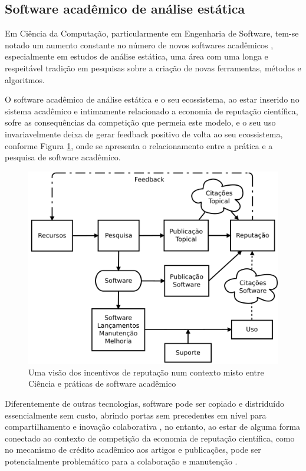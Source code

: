 \subsection{Software acadêmico de análise estática}

Em Ciência da Computação, particularmente em Engenharia de Software, tem-se
notado um aumento constante no número de novos softwares acadêmicos \cite{allen2017engineering},
especialmente em estudos de análise estática, 
uma área com uma longa e respeitável tradição em
pesquisas sobre a criação de novas ferramentas, métodos e algoritmos.

O software acadêmico de análise estática e o seu ecossistema, ao estar inserido
no sistema acadêmico e intimamente relacionado a economia de reputação
científica, sofre as consequências da competição que permeia este modelo, e o
seu uso invariavelmente deixa de gerar feedback positivo de volta ao seu ecossistema,
conforme Figura \ref{scientific-reputation-diagram}, onde se apresenta o
relacionamento entre a prática e a pesquisa de software acadêmico.

\begin{figure}[h]
  \center
  \includegraphics[scale=0.35]{imagens/scientific-reputation-diagram.png}
  \caption{Uma visão dos incentivos de reputação num contexto misto entre Ciência e práticas de software acadêmico \cite{howison2011scientific}}
  \label{scientific-reputation-diagram}
\end{figure}

Diferentemente de outras tecnologias, software pode ser copiado e distriduído
essencialmente sem custo, abrindo portas sem precedentes em nível para
compartilhamento e inovação colaborativa \cite{howison2011scientific}, no
entanto, ao estar de alguma forma conectado ao contexto de competição da economia de
reputação científica, como no mecanismo de crédito acadêmico aos artigos e publicações,
pode ser potencialmente problemático para a colaboração e manutenção
\cite{howison2011scientific}.

